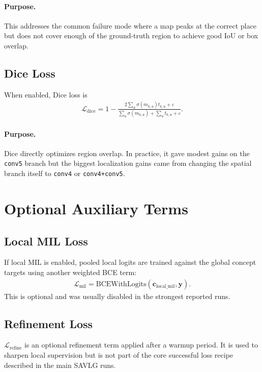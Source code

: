 \documentclass[11pt]{article}
\begin{document}
\paragraph{Purpose.}
This addresses the common failure mode where a map peaks at the correct place but
does not cover enough of the ground-truth region to achieve good IoU or box overlap.

\subsection{Dice Loss}
When enabled, Dice loss is
\begin{align}
\mathcal{L}_{\mathrm{dice}}
=
1 -
\frac{
2 \sum_{u} \sigma(m_{k,u}) t_{k,u} + \varepsilon
}{
\sum_{u} \sigma(m_{k,u}) + \sum_{u} t_{k,u} + \varepsilon
}.
\end{align}

\paragraph{Purpose.}
Dice directly optimizes region overlap. In practice, it gave modest gains on the
\texttt{conv5} branch but the biggest localization gains came from changing the
spatial branch itself to \texttt{conv4} or \texttt{conv4+conv5}.

\section{Optional Auxiliary Terms}

\subsection{Local MIL Loss}
If local MIL is enabled, pooled local logits are trained against the global concept
targets using another weighted BCE term:
\begin{align}
\mathcal{L}_{\mathrm{mil}}
=
\mathrm{BCEWithLogits}(\bm{c}_{\mathrm{local\_mil}}, \bm{y}).
\end{align}
This is optional and was usually disabled in the strongest reported runs.

\subsection{Refinement Loss}
\(\mathcal{L}_{\mathrm{refine}}\) is an optional refinement term applied after a
warmup period. It is used to sharpen local supervision but is not part of the core
successful loss recipe described in the main SAVLG runs.
\end{document}
